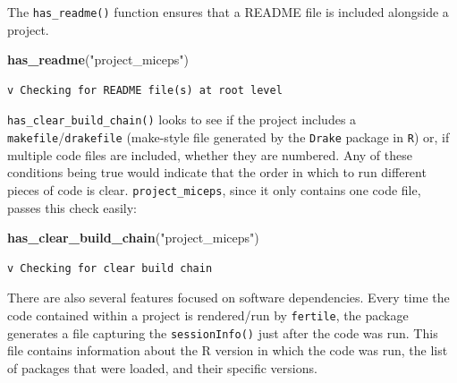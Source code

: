 \documentclass[12pt,twoside]{reedthesis}
\newenvironment{Shaded}{\begin{snugshade}}{\end{snugshade}}
\newcommand{\KeywordTok}[1]{\textcolor[rgb]{0.13,0.29,0.53}{\textbf{#1}}}
\newcommand{\StringTok}[1]{\textcolor[rgb]{0.31,0.60,0.02}{#1}}
\newcommand{\NormalTok}[1]{#1}
\begin{document}
The \texttt{has\_readme()} function ensures that a README file is
included alongside a project.
\begin{Shaded}
\begin{Highlighting}[]
\KeywordTok{has_readme}\NormalTok{(}\StringTok{"project_miceps"}\NormalTok{)}
\end{Highlighting}
\end{Shaded}
\begin{verbatim}
v Checking for README file(s) at root level
\end{verbatim}
\texttt{has\_clear\_build\_chain()} looks to see if the project includes
a \texttt{makefile}/\texttt{drakefile} (make-style file generated by the
\texttt{Drake} package in \texttt{R}) or, if multiple code files are
included, whether they are numbered. Any of these conditions being true
would indicate that the order in which to run different pieces of code
is clear. \texttt{project\_miceps}, since it only contains one code
file, passes this check easily:
\begin{Shaded}
\begin{Highlighting}[]
\KeywordTok{has_clear_build_chain}\NormalTok{(}\StringTok{"project_miceps"}\NormalTok{)}
\end{Highlighting}
\end{Shaded}
\begin{verbatim}
v Checking for clear build chain
\end{verbatim}
There are also several features focused on software dependencies. Every
time the code contained within a project is rendered/run by
\texttt{fertile}, the package generates a file capturing the
\texttt{sessionInfo()} just after the code was run. This file contains
information about the R version in which the code was run, the list of
packages that were loaded, and their specific versions.
\end{document}
